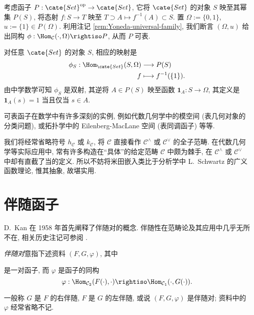 \begin{example}
	考虑函子 $P: \cate{Set}^\text{op} \to \cate{Set}$, 它将 $\cate{Set}$ 的对象 $S$ 映至其幂集 $P(S)$, 将态射 $f: S \to T$ 映至 $T \supset A \mapsto f^{-1}(A) \subset S$. 置 $\Omega := \{0, 1\}$, $u := \{1\} \in P(\Omega)$. 利用注记 \ref{rem:Yoneda-universal-family}, 我们断言 $(\Omega, u)$ 给出同构 $ \phi: \Hom_{\mathcal{C}}(\cdot, \Omega) \rightiso P$, 从而 $P$ 可表.

	对任意 $\cate{Set}$ 的对象 $S$, 相应的映射是
	\begin{align*}
		\phi_S: \Hom_{\cate{Set}}(S, \Omega) & \longrightarrow P(S) \\
		f & \longmapsto f^{-1}(\{1\}).
	\end{align*}
	由中学数学可知 $\phi_S$ 是双射, 其逆将 $A \in P(S)$ 映至函数 $\mathbf{1}_A:  S \to \Omega$, 其定义是 $\mathbf{1}_A (s)=1$ 当且仅当 $s \in A$.
\end{example}
可表函子在数学中有许多深刻的实例, 例如代数几何学中的模空间 (表几何对象的分类问题), 或拓扑学中的 Eilenberg-MacLane 空间 (表同调函子) 等等.

我们将经常省略符号 $h_{\mathcal{C}}$ 或 $k_{\mathcal{C}}$, 将 $\mathcal{C}$ 直接看作 $\mathcal{C}^\wedge$ 或 $\mathcal{C}^\vee$ 的全子范畴. 在代数几何学等实际应用中, 常有许多构造在``具体''的给定范畴 $\mathcal{C}$ 中颇为棘手, 在 $\mathcal{C}^\wedge$ 或 $\mathcal{C}^\vee$ 中却有直截了当的定义. 所以不妨将米田嵌入类比于分析学中 L.\ Schwartz 的广义函数理论, 惟其抽象, 故堪实用.

\section{伴随函子}\label{sec:adjoint-functor}
D.\ Kan 在 1958 年首先阐释了伴随对的概念. 伴随性在范畴论及其应用中几乎无所不在, 相关历史注记可参阅 \cite[p.107]{ML98}.
\begin{definition}\label{def:adjunction-pair} 
	\emph{伴随对}意指下述资料 $(F, G, \varphi)$, 其中
	是一对函子, 而 $\varphi$ 是函子的同构
	\[ \varphi: \Hom_{\mathcal{C}_2}(F(\cdot), \cdot) \rightiso \Hom_{\mathcal{C}_1}(\cdot, G(\cdot)). \]
\end{definition}
一般称 $G$ 是 $F$ 的右伴随, $F$ 是 $G$ 的左伴随, 或说 $(F, G, \varphi)$ 是伴随对; 资料中的 $\varphi$ 经常省略不记.


